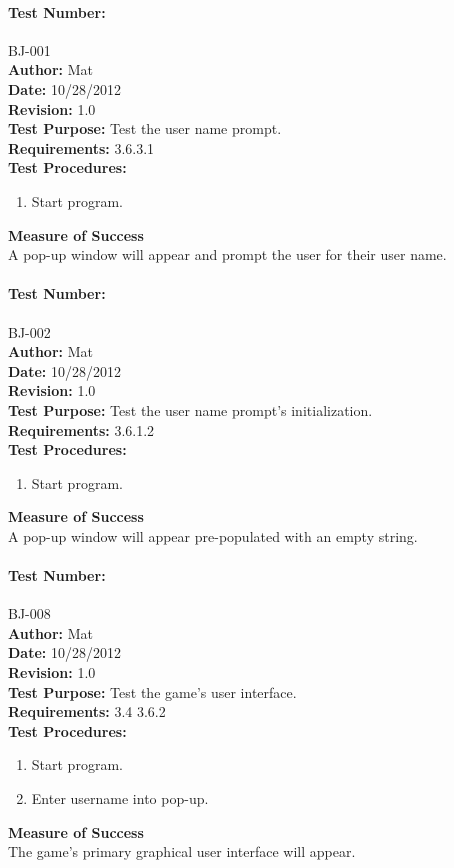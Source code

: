 \documentclass{article}
\begin{document}
\paragraph{Test Number:} BJ-001\\
\textbf{Author:} Mat\\
\textbf{Date:} 10/28/2012\\
\textbf{Revision:} 1.0\\
\textbf{Test Purpose:} Test the user name prompt.\\
\textbf{Requirements:} 3.6.3.1 \\
\textbf{Test Procedures:} 
\begin{enumerate}
\item Start program.
\end{enumerate}
\textbf{Measure of Success}\\A pop-up window will appear and prompt the user for their user name.
\paragraph{Test Number:} BJ-002\\
\textbf{Author:} Mat\\
\textbf{Date:} 10/28/2012\\
\textbf{Revision:} 1.0\\
\textbf{Test Purpose:} Test the user name prompt's initialization.\\
\textbf{Requirements:} 3.6.1.2 \\
\textbf{Test Procedures:} 
\begin{enumerate}
\item Start program.
\end{enumerate}
\textbf{Measure of Success}\\A pop-up window will appear pre-populated with an empty string.
\paragraph{Test Number:} BJ-008\\
\textbf{Author:} Mat\\
\textbf{Date:} 10/28/2012\\
\textbf{Revision:} 1.0\\
\textbf{Test Purpose:} Test the game's user interface.\\
\textbf{Requirements:} 3.4 3.6.2 \\
\textbf{Test Procedures:} 
\begin{enumerate}
\item Start program.
\item Enter username into pop-up.
\end{enumerate}
\textbf{Measure of Success}\\The game's primary graphical user interface will appear.
\end{document}
